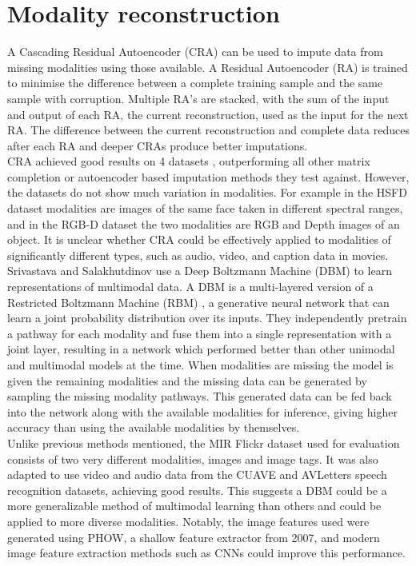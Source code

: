 \section{Modality reconstruction}
\label{section:reconstruction}
A Cascading Residual Autoencoder (CRA) \cite{CRA} can be used to impute data from missing modalities using those available. A Residual Autoencoder (RA) is trained to minimise the difference between a complete training sample and the same sample with corruption. Multiple RA’s are stacked, with the sum of the input and output of each RA, the current reconstruction, used as the input for the next RA. The difference between the current reconstruction and complete data reduces after each RA and deeper CRAs produce better imputations.\\

CRA achieved good results on 4 datasets \cite{CRA}, outperforming all other matrix completion or autoencoder based imputation methods they test against. However, the datasets do not show much variation in modalities. For example in the HSFD dataset modalities are images of the same face taken in different spectral ranges, and in the RGB-D dataset the two modalities are RGB and Depth images of an object. It is unclear whether CRA could be effectively applied to modalities of significantly different types, such as audio, video, and caption data in movies.\\

Srivastava and Salakhutdinov \cite{DBM} use a Deep Boltzmann Machine (DBM) to learn representations of multimodal data. A DBM is a multi-layered version of a Restricted Boltzmann Machine (RBM) \cite{RBM}, a generative neural network that can learn a joint probability distribution over its inputs. They independently pretrain a pathway for each modality and fuse them into a single representation with a joint layer, resulting in a network which performed better than other unimodal and multimodal models at the time. When modalities are missing the model is given the remaining modalities and the missing data can be generated by sampling the missing modality pathways. This generated data can be fed back into the network along with the available modalities for inference, giving higher accuracy than using the available modalities by themselves.\\

Unlike previous methods mentioned, the MIR Flickr dataset used for evaluation consists of two very different modalities, images and image tags. It was also adapted to use video and audio data from the CUAVE and AVLetters speech recognition datasets, achieving good results. This suggests a DBM could be a more generalizable method of multimodal learning than others and could be applied to more diverse modalities. Notably, the image features used were generated using PHOW, a shallow feature extractor from 2007, and modern image feature extraction methods such as CNNs could improve this performance.\\

